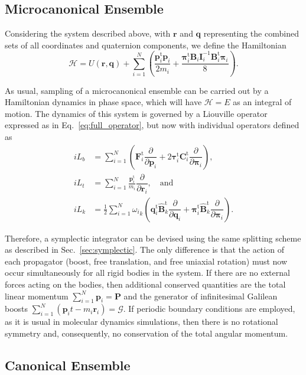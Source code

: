 \documentclass[aip,jcp,reprint,amsmath,amssymb]{revtex4-1}
\newcommand{\mt}[1]{\boldsymbol{\mathbf{#1}}}           %
\newcommand{\vt}[1]{\boldsymbol{\mathbf{#1}}}           %
\newcommand{\tr}[1]{#1^\text{t}}                               %
\newcommand{\diff}[2]{\dfrac{\partial #1}{\partial #2}} %
\begin{document}
\subsection{Microcanonical Ensemble}

Considering the system described above, with $\vt r$ and $\vt q$ representing the combined sets of all coordinates and quaternion components, we define the Hamiltonian
\begin{equation}
\label{eq:H_NVE}
\mathcal{H} = U(\vt r,\vt q) + \sum_{i=1}^N \left(\frac{\tr{\vt p}_i{\vt p}_i}{2m_i} + \frac{\tr{\vt \pi}_i {\mt B}_i {\mt I}_i^{-1} \tr{\mt B}_i {\vt \pi}_i}{8}\right).
\end{equation}

As usual, sampling of a microcanonical ensemble can be carried out by a Hamiltonian dynamics in phase space, which will have $\mathcal{H} = E$ as an integral of motion. The dynamics of this system is governed by a Liouville operator expressed as in Eq.~\ref{eq:full_operator}, but now with individual operators defined as
\[
\begin{split}
i\!L_b &= \sum_{i=1}^N \left( \tr{\vt F}_i \diff{}{\vt p_i} + 2 \tr{\vt \tau}_i \tr{\mt C}_i \diff{}{\vt \pi_i} \right), \\
i\!L_t &= \sum_{i=1}^N \frac{\tr{\vt p}_i}{m_i}\diff{}{\vt r_i}, \quad \text{and} \\
i\!L_k &= \frac{1}{2} \sum_{i=1}^N {\omega_i}_k \left( \tr{\vt q}_i\tr{\hat{\mt B}_k} \diff{}{\vt q_i} + \tr{\vt \pi_i}\tr{\hat{\mt B}_k} \diff{}{\vt \pi_i} \right).
\end{split}
\]

Therefore, a symplectic integrator can be devised using the same splitting scheme as described in Sec.~\ref{sec:symplectic}. The only difference is that the action of each propagator (boost, free translation, and free uniaxial rotation) must now occur simultaneously for all rigid bodies in the system. If there are no external forces acting on the bodies, then additional conserved quantities are the total linear momentum $\sum_{i=1}^N \vt p_i = \vt P$ and the generator of infinitesimal Galilean boosts\cite{Ray1999, Schwichtenberg2015} $\sum_{i=1}^N(\vt p_i t - m_i \vt r_i) = \boldsymbol{\mathcal G}$. If periodic boundary conditions are employed, as it is usual in molecular dynamics simulations, then there is no rotational symmetry and, consequently, no conservation of the total angular momentum.

\subsection{Canonical Ensemble}
\label{sec:canonical}
\end{document}

